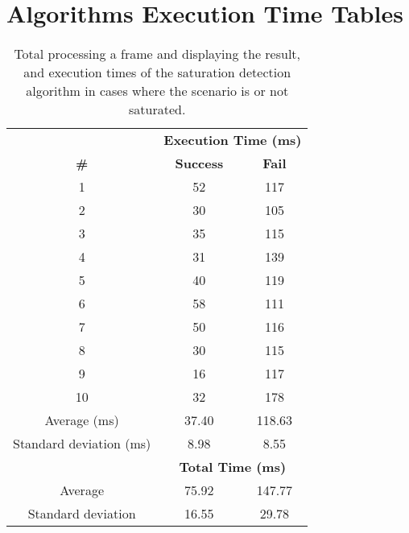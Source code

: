 \chapter{Algorithms Execution Time Tables}
\label{app:exec_times}

\begin{table}[h]
	\footnotesize
    \begin{center}
    \begin{tabular}{c c c}
    \hline 
    &\multicolumn{2}{c}{\textbf{Execution Time (ms)}}\\
    \textbf{\#} &
    \textbf{Success} & \textbf{Fail}\\ \hline
	1 &	52 &	117\\
	2 &	30 &	105\\
	3 &	35 &	115\\
	4 &	31 &	139\\
	5 &	40 &	119\\
	6 &	58 &	111\\
	7 &	50 &	116\\
	8 &	30 & 	115\\
	9 &	16 &	117\\
	10 &	32 &	178\\
	\hline
	Average (ms) &	37.40&	118.63 \\
	Standard deviation (ms) &	8.98&	8.55\\
	\hline	
	& \multicolumn{2}{c}{\textbf{Total Time (ms)}}\\
    \hline
    Average	& 75.92 & 147.77 \\
    Standard deviation & 16.55 & 29.78\\
    \hline
    \end{tabular}
	\end{center}
	\caption{Total processing a frame and displaying the result, and execution times of the saturation detection algorithm in cases where the scenario is or not saturated.}
	\label{tab:sat}
\end{table}


